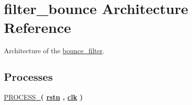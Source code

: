 \hypertarget{classbounce__filter_1_1filter__bounce}{\section{filter\-\_\-bounce Architecture Reference}
\label{classbounce__filter_1_1filter__bounce}
}


Architecture of the \hyperlink{classbounce__filter}{bounce\-\_\-filter}.  


\subsection*{Processes}
 \begin{DoxyCompactItemize}
\item 
\hypertarget{classbounce__filter_1_1filter__bounce_a68c86990d057b8db759843e21da325c7}{\hyperlink{classbounce__filter_1_1filter__bounce_a68c86990d057b8db759843e21da325c7}{P\-R\-O\-C\-E\-S\-S\-\_}{\bfseries  ( {\bfseries {\bfseries \hyperlink{classbounce__filter_aba021aec4b477b89079bb58ccadcc67e}{rstn}} \textcolor{vhdlchar}{ }\textcolor{vhdlchar}{ }\textcolor{vhdlchar}{ }} , {\bfseries {\bfseries \hyperlink{classbounce__filter_a8120037e0ee47c35ba2d79242209c72e}{clk}} \textcolor{vhdlchar}{ }} )}}\label{classbounce__filter_1_1filter__bounce_a68c86990d057b8db759843e21da325c7}

\end{DoxyCompactItemize}
